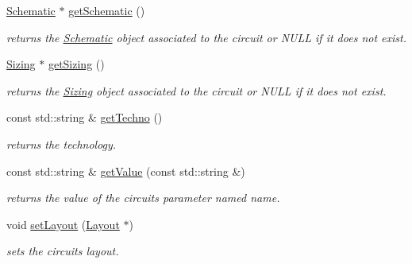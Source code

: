 \begin{DoxyCompactItemize}
\mbox{\label{class_open_chams_1_1_circuit_af6f967a5685ac92fe760f4eb95c8c51f}} 
\hyperlink{class_open_chams_1_1_schematic}{Schematic} $\ast$ \hyperlink{class_open_chams_1_1_circuit_af6f967a5685ac92fe760f4eb95c8c51f}{get\+Schematic} ()
\begin{DoxyCompactList}\small\item\em returns the \hyperlink{class_open_chams_1_1_schematic}{Schematic} object associated to the circuit or N\+U\+LL if it does not exist. \end{DoxyCompactList}\item 
\mbox{\label{class_open_chams_1_1_circuit_a0ce52bc8747f684ec0123faa8ff97b6d}} 
\hyperlink{class_open_chams_1_1_sizing}{Sizing} $\ast$ \hyperlink{class_open_chams_1_1_circuit_a0ce52bc8747f684ec0123faa8ff97b6d}{get\+Sizing} ()
\begin{DoxyCompactList}\small\item\em returns the \hyperlink{class_open_chams_1_1_sizing}{Sizing} object associated to the circuit or N\+U\+LL if it does not exist. \end{DoxyCompactList}\item 
\mbox{\label{class_open_chams_1_1_circuit_a3538c326d799dd26fbb17c4ac6c4647e}} 
const std\+::string \& \hyperlink{class_open_chams_1_1_circuit_a3538c326d799dd26fbb17c4ac6c4647e}{get\+Techno} ()
\begin{DoxyCompactList}\small\item\em returns the technology. \end{DoxyCompactList}\item 
const std\+::string \& \hyperlink{class_open_chams_1_1_circuit_a6650bf10e394fe2d6fa1d50e247da296}{get\+Value} (const std\+::string \&)
\begin{DoxyCompactList}\small\item\em returns the value of the circuit\textquotesingle{}s parameter named {\ttfamily name}. \end{DoxyCompactList}\item 
void \hyperlink{class_open_chams_1_1_circuit_a4babcbc5b9f7797cc0befb675d5f538c}{set\+Layout} (\hyperlink{class_open_chams_1_1_layout}{Layout} $\ast$)
\begin{DoxyCompactList}\small\item\em sets the circuit\textquotesingle{}s layout. \end{DoxyCompactList}\item 

\end{DoxyCompactItemize}
